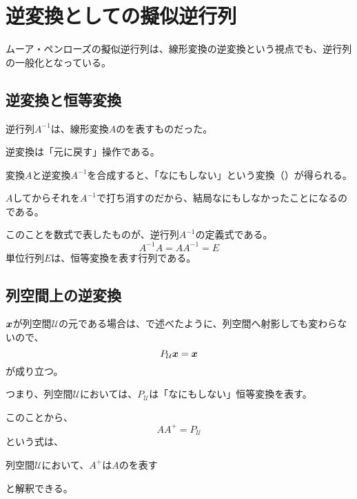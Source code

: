 \documentclass[../../../topic_linear-algebra]{subfiles}
\begin{document}
\sectionline
\section{逆変換としての擬似逆行列}

ムーア・ペンローズの擬似逆行列は、線形変換の逆変換という視点でも、逆行列の一般化となっている。

\subsection{逆変換と恒等変換}

逆行列$A^{-1}$は、線形変換$A$のを表すものだった。

逆変換は「元に戻す」操作である。

\br

変換$A$と逆変換$A^{-1}$を合成すると、「なにもしない」という変換（）が得られる。

$A$してからそれを$A^{-1}$で打ち消すのだから、結局なにもしなかったことになるのである。

\br

このことを数式で表したものが、逆行列$A^{-1}$の定義式である。
\begin{equation*}
  A^{-1} A = A A^{-1} = E
\end{equation*}
単位行列$E$は、恒等変換を表す行列である。

\subsection{列空間上の逆変換}

$\vb*{x}$が列空間$\mathcal{U}$の元である場合は、で述べたように、列空間へ射影しても変わらないので、
\begin{equation*}
  P_{\mathcal{U}} \vb*{x} = \vb*{x}
\end{equation*}
が成り立つ。

つまり、列空間$\mathcal{U}$においては、$P_{\mathcal{U}}$は「なにもしない」恒等変換を表す。

\br

このことから、
\begin{equation*}
  AA^+ = P_{\mathcal{U}}
\end{equation*}
という式は、
\begin{emphabox}
  \begin{spacebox}
    \begin{center}
      列空間$\mathcal{U}$において、$A^+$は$A$のを表す
    \end{center}
  \end{spacebox}
\end{emphabox}
と解釈できる。
\end{document}
